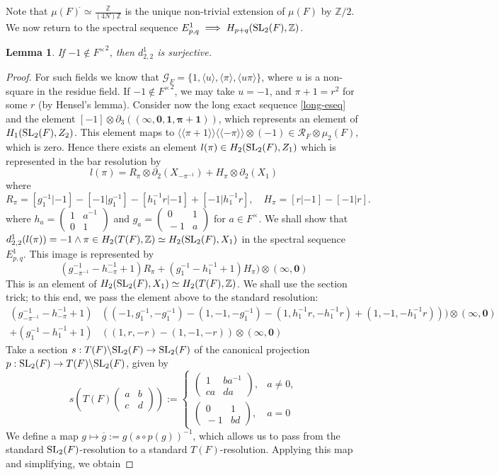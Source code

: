 \documentclass[11pt]{amsart}
\theoremstyle{definition}
\theoremstyle{plain}
\newtheorem{lem}[ntn]{Lemma}
\theoremstyle{definition}
\numberwithin{equation}{section}
\newcommand{\z}{\mathbb{Z}}
\newcommand{\GG}{\mathcal{G}}
\newcommand{\RR}{\mathcal{R}}
\newcommand{\lan}{\langle}
\newcommand{\ran}{\rangle}
\newcommand{\Lan}{\langle \! \langle}
\newcommand{\Ran}{\rangle \! \rangle}
\newcommand{\SL}{\mathit{{\rm SL}}}
\newcommand{\mtxx}[4]
{\left(\!\!
	\begin{array}{cc}
		\!\!#1 & \!\!#2\\
		\!\!#3 & \!\!#4
	\end{array}\!\!
	\right)}
\begin{document}
	Note that $\mu(F)^{\tilde{}}\simeq\frac{\z}{(4N)\z}$ is the unique non-trivial extension of $\mu(F)$ by $\z/2$. We now return to the spectral sequence $E^1_{p,q}\implies H_{p+q}(\SL_2(F),\z)$.
	\begin{lem}
		\label{d122-surj}
		If $-1\notin {F^{\times}}^2$, then $d^1_{2,2}$ is surjective.
	\end{lem}
	\begin{proof}
		For such fields we know that $\GG_F=\{1,\lan u\ran,\lan\pi\ran,\lan u\pi\ran\}$, where $u$ is a non-square in the residue field.
		If $-1\notin {F^\times}^2$, we may take $u=-1$, and $\pi+1=r^2$ for some $r$ (by Hensel's lemma). Consider now the long exact sequence \eqref{long-eseq} and the element $[-1]\otimes\partial_3((\pmb{\infty},\pmb{0},\pmb{1},\pmb{\pi+1}))$, which represents an element of $H_1(\SL_2(F),Z_2)$. This element maps to $\Lan\pi+1\Ran\Lan-\pi\Ran\otimes(-1)\in\RR_F\otimes\mu_2(F)$, which is zero. Hence there exists an element $l(\pi)\in H_2(\SL_2(F),Z_1)$ which is represented in the bar resolution by
		\[
		l(\pi)=R_{\pi}\otimes\partial_2(X_{-\pi^{-1}})+H_{\pi}\otimes\partial_2(X_1)
		\]
		where
		\[
		R_{\pi}=[g_1^{-1}|-1]-[-1|g_1^{-1}]-[h_1^{-1}r|-1]+[-1|h_1^{-1}r],\quad H_{\pi}=[r|-1]-[-1|r].
		\]
		where $h_{a}=\mtxx{1}{a^{-1}}{0}{1}$ and $g_a=\mtxx{0}{1}{-1}{a}$ for $a\in F^{\times}$. We shall show that $d^1_{2,2}(l(\pi))=-1\wedge\pi\in H_2(T(F),\z)\simeq H_2(\SL_2(F),X_1)$ in the spectral sequence $E^1_{p,q}$. This image is represented by
		\[
		(g_{-\pi^{-1}}^{-1}-h_{-\pi}^{-1}+1)R_{\pi}+(g_1^{-1}-h_1^{-1}+1)H_{\pi})\otimes(\pmb{\infty},\pmb{0})
		\]
		This is an element of $H_2(\SL_2(F),X_1)\simeq H_2(T(F),\z)$. We shall use the section trick; to this end, we pass the element above to the standard resolution: 
		\begin{align*}
			(g_{-\pi^{-1}}^{-1}-h_{-\pi}^{-1}+1)&((-1,g_1^{-1},-g_1^{-1})-(1,-1,-g_1^{-1})-(1,h_1^{-1}r,-h_1^{-1}r)+(1,-1,-h_1^{-1}r)))\otimes(\pmb{\infty},\pmb{0})\\
			+(g_1^{-1}-h_1^{-1}+1)&((1,r,-r)-(1,-1,-r))\otimes(\pmb{\infty},\pmb{0})
		\end{align*}
		Take a section $s:T(F)\backslash\SL_2(F)\to \SL_2(F)$ of the canonical projection $p:\SL_2(F)\to T(F)\backslash\SL_2(F)$, given by
		\[
		s(T(F)\mtxx{a}{b}{c}{d}):=\begin{cases}
			\mtxx{1}{ba^{-1}}{ca}{da}, & a\neq 0,\\
			\mtxx{0}{1}{-1}{bd}, & a = 0
		\end{cases}
		\]
		We define a map $g\mapsto\overline{g}:=g(s\circ p(g))^{-1}$, which allows us to pass from the standard $\SL_2(F)$-resolution to a standard $T(F)$-resolution. Applying this map and simplifying, we obtain

\end{proof}
\end{document}
